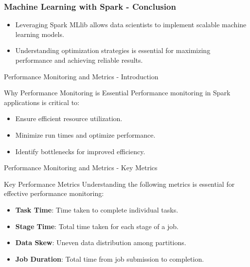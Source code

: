 \documentclass[aspectratio=169]{beamer}
\begin{document}
\begin{frame}[fragile]
    \frametitle{Machine Learning with Spark - Conclusion}
    \begin{itemize}
        \item Leveraging Spark MLlib allows data scientists to implement scalable machine learning models.
        \item Understanding optimization strategies is essential for maximizing performance and achieving reliable results.
    \end{itemize}
\end{frame}

\begin{frame}[fragile]{Performance Monitoring and Metrics - Introduction}
    \begin{block}{Why Performance Monitoring is Essential}
        Performance monitoring in Spark applications is critical to:
        \begin{itemize}
            \item Ensure efficient resource utilization.
            \item Minimize run times and optimize performance.
            \item Identify bottlenecks for improved efficiency.
        \end{itemize}
    \end{block}
\end{frame}

\begin{frame}[fragile]{Performance Monitoring and Metrics - Key Metrics}
    \begin{block}{Key Performance Metrics}
        Understanding the following metrics is essential for effective performance monitoring:
        \begin{itemize}
            \item \textbf{Task Time}: Time taken to complete individual tasks.
            \item \textbf{Stage Time}: Total time taken for each stage of a job.
            \item \textbf{Data Skew}: Uneven data distribution among partitions.
            \item \textbf{Job Duration}: Total time from job submission to completion.
        \end{itemize}
    \end{block}
\end{frame}
\end{document}
